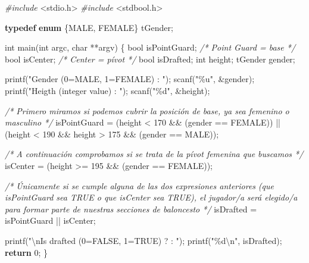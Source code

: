 \documentclass[
]{book}
\newenvironment{Shaded}{\begin{snugshade}}{\end{snugshade}}
\newcommand{\CommentTok}[1]{\textcolor[rgb]{0.56,0.35,0.01}{\textit{#1}}}
\newcommand{\ControlFlowTok}[1]{\textcolor[rgb]{0.13,0.29,0.53}{\textbf{#1}}}
\newcommand{\DataTypeTok}[1]{\textcolor[rgb]{0.13,0.29,0.53}{#1}}
\newcommand{\DecValTok}[1]{\textcolor[rgb]{0.00,0.00,0.81}{#1}}
\newcommand{\ImportTok}[1]{#1}
\newcommand{\KeywordTok}[1]{\textcolor[rgb]{0.13,0.29,0.53}{\textbf{#1}}}
\newcommand{\NormalTok}[1]{#1}
\newcommand{\PreprocessorTok}[1]{\textcolor[rgb]{0.56,0.35,0.01}{\textit{#1}}}
\newcommand{\SpecialCharTok}[1]{\textcolor[rgb]{0.00,0.00,0.00}{#1}}
\newcommand{\StringTok}[1]{\textcolor[rgb]{0.31,0.60,0.02}{#1}}
\begin{document}
\begin{Shaded}
\begin{Highlighting}[]
\PreprocessorTok{\#include }\ImportTok{\textless{}stdio.h\textgreater{}}
\PreprocessorTok{\#include }\ImportTok{\textless{}stdbool.h\textgreater{}}

\KeywordTok{typedef} \KeywordTok{enum}\NormalTok{ \{MALE, FEMALE\} tGender;}

\DataTypeTok{int}\NormalTok{ main(}\DataTypeTok{int}\NormalTok{ argc, }\DataTypeTok{char}\NormalTok{ **argv) \{}
    \DataTypeTok{bool}\NormalTok{ isPointGuard; }\CommentTok{/* Point Guard = base */}
    \DataTypeTok{bool}\NormalTok{ isCenter;     }\CommentTok{/* Center = pívot */}
    \DataTypeTok{bool}\NormalTok{ isDrafted;}
    \DataTypeTok{int}\NormalTok{ height;}
\NormalTok{    tGender gender;}

\NormalTok{    printf(}\StringTok{"Gender (0=MALE, 1=FEMALE) : "}\NormalTok{);}
\NormalTok{    scanf(}\StringTok{"\%u"}\NormalTok{, \&gender);}
\NormalTok{    printf(}\StringTok{"Heigth (integer value) : "}\NormalTok{);}
\NormalTok{    scanf(}\StringTok{"\%d"}\NormalTok{, \&height);}

    \CommentTok{/* Primero miramos si podemos cubrir la posición de base, ya sea femenino o masculino */}
\NormalTok{    isPointGuard = }
\NormalTok{        (height \textless{} }\DecValTok{170}\NormalTok{ \&\& (gender == FEMALE)) ||}
\NormalTok{        (height \textless{} }\DecValTok{190}\NormalTok{ \&\& height \textgreater{} }\DecValTok{175}\NormalTok{ \&\& (gender == MALE));}

    \CommentTok{/* A continuación comprobamos si se trata de la pívot femenina que buscamos */}
\NormalTok{    isCenter = (height \textgreater{}= }\DecValTok{195}\NormalTok{ \&\& (gender == FEMALE));}

    \CommentTok{/* Únicamente si se cumple alguna de las dos expresiones anteriores }
\CommentTok{       (que isPointGuard sea TRUE o que isCenter sea TRUE), el jugador/a }
\CommentTok{       será elegido/a para formar parte de nuestras secciones de baloncesto */}
\NormalTok{    isDrafted = isPointGuard || isCenter;}

\NormalTok{    printf(}\StringTok{"}\SpecialCharTok{\textbackslash{}n}\StringTok{Is drafted (0=FALSE, 1=TRUE) ? : "}\NormalTok{);}
\NormalTok{    printf(}\StringTok{"\%d}\SpecialCharTok{\textbackslash{}n}\StringTok{"}\NormalTok{, isDrafted);}
    \ControlFlowTok{return} \DecValTok{0}\NormalTok{;}
\NormalTok{\}}
\end{Highlighting}
\end{Shaded}
\end{document}
